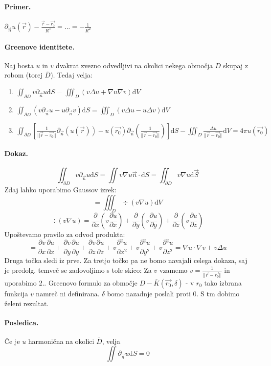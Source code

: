 \documentclass[a4paper]{article}
\newcommand{\vct}[1]{\overrightarrow{#1}}
\newcommand{\dif}{\mathrm{d}}
\newcommand{\pd}[2]{\frac{\partial {#1}}{\partial {#2}}}
\begin{document}
\paragraph{Primer.} $\displaystyle{\partial_{\vct{n}}u(\vct{r}) -\frac{\vct{r} - \vct{r_0}}{R^3} = ... = -\frac{1}{R^2}}$
\paragraph{Greenove identitete.} Naj bosta $u$ in $v$ dvakrat zvezno odvedljivi na okolici nekega območja $D$ skupaj z robom (torej $\overline{D}$).
Tedaj velja:\begin{enumerate}
    \item $\displaystyle{\iint_{\partial D} v \partial_{\vct{n}}u\dif S = \iiint_D(v\Delta u + \nabla u \nabla v)\dif V}$
    \item $\displaystyle{\iint_{\partial D} (v \partial_{\vct{n}}u - u\partial_{\vct{n}} v)\dif S = \iiint_D(v\Delta u - u \Delta v)\dif V}$
    \item $\displaystyle{\iint_{\partial D}\left[\frac{1}{||\vct{r} - \vct{r_0}||}\partial_{\vct{n}}\left(u(\vct{r})\right) - u(\vct{r_0})\partial_{\vct{n}}\left(\frac{1}{||\vct{r} - \vct{r_0}||}\right)\right]\dif S - \iiint_D\frac{\Delta u}{||\vct{r} - \vct{r_0}||}\dif V = 4\pi u(\vct{r_0})}$
\end{enumerate}
\paragraph{Dokaz.}
$$\iint_{\partial D} v\partial_{\vct{n}}u \dif S = \iint v\nabla u \vct{n}\cdot\dif S = \iint_{\partial D} v \nabla u \dif\vct{S}$$
Zdaj lahko uporabimo Gaussov izrek:
$$= \iiint_D \div (v\nabla u)\dif V$$
$$\div(v\nabla u) = \pd{}{x}\left(v\pd{u}{x}\right) + \pd{}{y}\left(v\pd{u}{y}\right) + \pd{}{z}\left(v\pd{u}{z}\right)$$
Upoštevamo pravilo za odvod produkta:
$$= \pd{v}{x}\pd{u}{x} + \pd{v}{y}\pd{u}{y} + \pd{v}{z}\pd{u}{z} + v\pd{^2u}{x^2} + v\pd{^2u}{y^2} + v\pd{^2u}{z^2} = \nabla u\cdot \nabla v + v\Delta u$$
Druga točka sledi iz prve. Za tretjo točko pa ne bomo navajali celega dokaza, saj je predolg, temveč se zadovoljimo s tole skico:
Za $v$ vzamemo $\displaystyle{v = \frac{1}{||\vct{r} - \vct{r_0}||}}$ in uporabimo 2.. Greenovo formulo za območje $D - \overline{K}(\vct{r_0}, \delta)$ - v $r_0$ tako izbrana funkcija $v$ namreč ni definirana. $\delta$ bomo nazadnje poslali proti $0$.
S tm dobimo želeni rezultat.
\paragraph{Posledica.} Če je $u$ harmonična na okolici $\overline{D}$, velja
$$\iint\partial_{\vct{n}}u\dif S = 0$$
\end{document}
